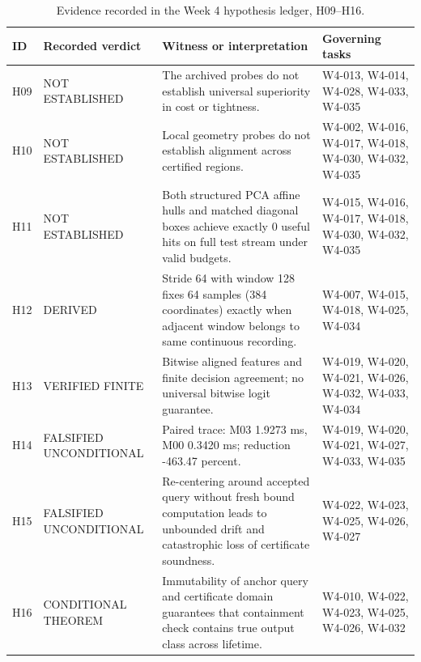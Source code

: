 \begin{table}[H]
\caption{Evidence recorded in the Week 4 hypothesis ledger, H09--H16.}
\centering\small
\begin{tabularx}{\textwidth}{@{}lYYY@{}}\toprule
ID & Recorded verdict & Witness or interpretation & Governing tasks\\
\midrule
H09 & NOT ESTABLISHED & The archived probes do not establish universal superiority in cost or tightness. & W4-013, W4-014, W4-028, W4-033, W4-035\\
H10 & NOT ESTABLISHED & Local geometry probes do not establish alignment across certified regions. & W4-002, W4-016, W4-017, W4-018, W4-030, W4-032, W4-035\\
H11 & NOT ESTABLISHED & Both structured PCA affine hulls and matched diagonal boxes achieve exactly 0 useful hits on full test stream under valid budgets. & W4-015, W4-016, W4-017, W4-018, W4-030, W4-032, W4-035\\
H12 & DERIVED & Stride 64 with window 128 fixes 64 samples (384 coordinates) exactly when adjacent window belongs to same continuous recording. & W4-007, W4-015, W4-018, W4-025, W4-034\\
H13 & VERIFIED FINITE & Bitwise aligned features and finite decision agreement; no universal bitwise logit guarantee. & W4-019, W4-020, W4-021, W4-026, W4-032, W4-033, W4-034\\
H14 & FALSIFIED UNCONDITIONAL & Paired trace: M03 1.9273 ms, M00 0.3420 ms; reduction -463.47 percent. & W4-019, W4-020, W4-021, W4-027, W4-033, W4-035\\
H15 & FALSIFIED UNCONDITIONAL & Re-centering around accepted query without fresh bound computation leads to unbounded drift and catastrophic loss of certificate soundness. & W4-022, W4-023, W4-025, W4-026, W4-027\\
H16 & CONDITIONAL THEOREM & Immutability of anchor query and certificate domain guarantees that containment check contains true output class across lifetime. & W4-010, W4-022, W4-023, W4-025, W4-026, W4-032\\
\bottomrule\end{tabularx}
\end{table}
